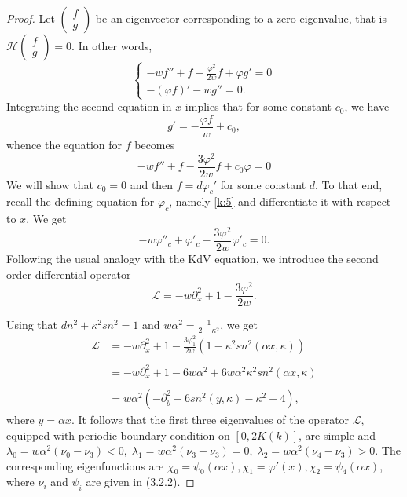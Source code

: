 \documentclass[final,11pt,leqno]{amsart}
\begin{document}
\begin{proof}
Let $\left(\begin{array}{c} f \\ g
\end{array}\right)$ be an eigenvector corresponding to a zero eigenvalue, that is ${\mathcal H} \left(\begin{array}{c} f \\ g
\end{array}\right)=0$. In other words,
\begin{equation}
\label{k:50}
\left\{
\begin{array}{l}
-w f''+f-{\frac{{{\varphi}^2}}{{2w}}} f+{\varphi} g'=0 \\
-({\varphi} f)'-w g''=0.
\end{array}\right.
\end{equation}
Integrating the second equation in $x$ implies that for some constant $c_0$, we have
$$
g'=-{\frac{{{\varphi} f}}{{w}}}+c_0,
$$
whence the equation for $f$ becomes
\begin{equation}
\label{k:60}
 -w f''+f-{\frac{{3{\varphi}^2}}{{2w}}} f+c_0 {\varphi}=0
\end{equation}
We will show that $c_0=0$ and then $f=d {\varphi}_c'$ for some constant $d$.
To that end, recall the defining equation for ${\varphi}_c$, namely \eqref{k:5} and differentiate it with respect to $x$. We get
\begin{equation}
\label{k:70}
-w {\varphi}''_c+{\varphi}'_c-{\frac{{3{\varphi}^2}}{{2w}}} {\varphi}'_c=0.
\end{equation}
Following the usual analogy with the KdV equation, we introduce the second order differential operator
$$
{\mathcal L}=-w{\partial}^2_{x}+1-{\frac{{3{\varphi}^2}}{{2w}}}.
$$

Using that $dn^2+\kappa^2sn^2=1$ and $w\alpha^2={\frac{1}{2-\kappa^2}}$, we get
  $$\begin{array}{ll}
    {\mathcal L} &=-w{\partial}^2_{x}+1-{\frac{3{\varphi}_1^2}{2w}}(1-\kappa^2 sn^2(\alpha x, \kappa))\\
    \\
    &=-w{\partial}^2_{x}+1-6w\alpha^2+6w\alpha^2\kappa^2sn^2(\alpha x, \kappa)\\
    \\
    &=w\alpha^2(-{\partial}^2_{y}+6sn^2(y, \kappa)-\kappa^2-4),
    \end{array}
  $$
   where $y=\alpha x$. It follows that the first three eigenvalues of the operator
      $\mathcal{L}$, equipped with periodic boundary condition on $[0,2K(k)]$,
      are simple and $\lambda_0=w\alpha^2(\nu_0-\nu_3)<0, \;
      \lambda_1=w\alpha^2(\nu_3-\nu_3)=0, \;
      \lambda_{2}=w\alpha^2(\nu_4-\nu_3)>0$.
The corresponding eigenfunctions are $\chi_0=\psi_0(\alpha x),
\chi_1=\varphi'(x), \chi_2=\psi_4(\alpha x)$, where $\nu_i$ and $\psi_i$ are given in (3.2.2).


\end{proof}
\end{document}
